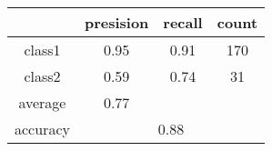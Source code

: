 
    \begin{tabular}{ | c | c | c | c | }
	\hline
	         &presision & recall & count \\ \hline
	class1   & 0.95    & 0.91  & 170 \\ \hline
	class2   & 0.59    & 0.74  & 31 \\ \hline
	average  & 0.77    &        &       \\
	\hline
	accuracy & \multicolumn{3}{c|}{0.88}\\
	\hline
    \end{tabular}